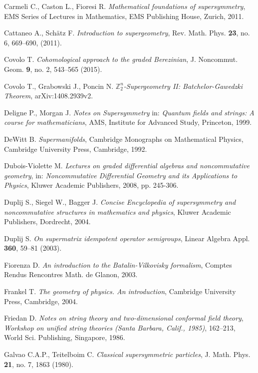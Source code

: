 \documentclass[11pt,a4paper]{report}
\theoremstyle{definition}
\begin{document}
\begin{thebibliography}{}
Carmeli C., Caston L., Fioresi R. \textit{Mathematical foundations of supersymmetry}, EMS Series of Lectures in Mathematics, EMS Publishing House, Zurich, 2011.

Cattaneo A., Sch\"atz F. \textit{Introduction to supergeometry}, Rev. Math. Phys. {\bf 23}, no. 6, 669--690, (2011).

Covolo T.
{\it  Cohomological approach to the graded Berezinian}, J. Noncommut. Geom. {\bf 9}, no. 2, 543--565 (2015).

Covolo T., Grabowski J., Poncin N. \textit{$\mathbb{Z}_2^n$-Supergeometry II: Batchelor-Gawedzki Theorem}, arXiv:1408.2939v2.

Deligne P., Morgan J.
{\it Notes on Supersymmetry} in: {\sl 
Quantum fields and strings: A course for
mathematicians},
AMS, Institute for Advanced Study, Princeton,
1999.

DeWitt B. \textsl{Supermanifolds}, Cambridge Monographs on Mathematical Physics, Cambridge University Press, Cambridge, 1992. 

Dubois-Violette M. {\it 
Lectures on graded differential algebras and noncommutative geometry}, in: {\sl Noncommutative Differential Geometry and its Applications to Physics}, Kluwer Academic Publishers, 2008, pp. 245-306.

Duplij S., Siegel W., Bagger J.
{\sl Concise Encyclopedia of supersymmetry and noncommutative structures in mathematics and physics}, Kluwer Academic Publishers, Dordrecht, 2004.

Duplij S. \textit{On supermatrix idempotent operator semigroups}, Linear Algebra  Appl. {\bf 360}, 59--81 (2003).

Fiorenza D. \textit{An introduction to the Batalin-Vilkovisky formalism}, Comptes Rendus Rencontres Math. de Glanon, 2003.

Frankel T. \textsl{The geometry of physics. An introduction}, Cambridge University Press, Cambridge, 2004.

Friedan D. \textit{Notes on string theory and two-dimensional conformal field theory}, \textsl{Workshop on unified string theories (Santa Barbara, Calif., 1985)}, 162--213, World Sci. Publishing, Singapore, 1986.

Galvao C.A.P., Teitelboim C. {\it Classical supersymmetric particles}, J. Math. Phys. {\bf 21}, no. 7, 1863 (1980).


\end{thebibliography}
\end{document}
